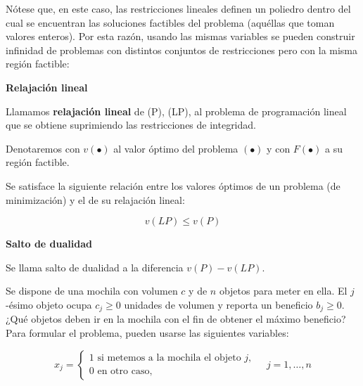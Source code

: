 \documentclass[openany]{book}
\begin{document}
Nótese que, en este caso, las restricciones lineales definen un poliedro dentro del cual se encuentran las soluciones factibles del problema (aquéllas que toman valores enteros). Por esta razón, usando las mismas variables se pueden construir infinidad de problemas con distintos conjuntos de restricciones pero con la misma región factible:


\begin{definition}
    { \color{turquoise} \textbf{Relajación lineal}}

Llamamos \textbf{relajación lineal} de (P), (LP), al problema de programación lineal que se obtiene suprimiendo las restricciones de integridad.

Denotaremos con $v(\bullet)$ al valor óptimo del problema $(\bullet)$ y con $F(\bullet)$ a su región factible.
\end{definition}


\begin{proposition}
  Se satisface la siguiente relación entre los valores óptimos de un problema (de minimización) y el de su relajación lineal:

  $$
  v(L P) \leq v(P)
  $$
\end{proposition}


\begin{definition}
  { \color{turquoise} \textbf{Salto de dualidad}}

  Se llama salto de dualidad a la diferencia $v(P)-v(L P)$.

\end{definition}

\begin{example}
  Se dispone de una mochila con volumen $c$ y de $n$ objetos para meter en ella. El $j$-ésimo objeto ocupa $c_{j} \geq 0$ unidades de volumen y reporta un beneficio $b_{j} \geq 0$. ¿Qué objetos deben ir en la mochila con el fin de obtener el máximo beneficio? Para formular el problema, pueden usarse las siguientes variables:

  $$
  x_{j}=\left\{\begin{array}{l}
  1 \text { si metemos a la mochila el objeto } j, \\
  0 \text { en otro caso, }
  \end{array} \quad j=1, \ldots, n\right.
  $$

\end{example}
\end{document}
